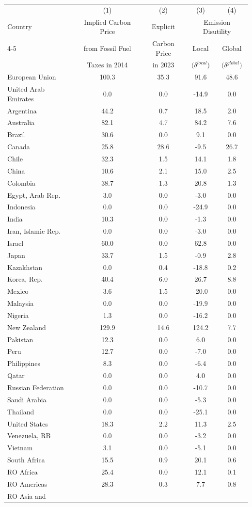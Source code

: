 \begin{tabular}{l c c cc}
\toprule
        & (1)         & (2)          & (3) & (4) \\
\addlinespace[3pt]
Country & Implied Carbon Price  & Explicit        & \multicolumn{2}{c}{Emission Disutility} \\
\cline{4-5}
\addlinespace[2pt]
        &  from Fossil Fuel            & Carbon Price    & Local & Global \\
        &   Taxes in 2014          & in 2023         & $\Big( \delta^{local} \Big)$ & $ \Big( \delta^{global} \Big)$ \\
\midrule
European Union & 100.3 & 35.3 & 91.6 & 48.6 \\United Arab Emirates & 0.0 & 0.0 & -14.9 & 0.0 \\Argentina & 44.2 & 0.7 & 18.5 & 2.0 \\Australia & 82.1 & 4.7 & 84.2 & 7.6 \\Brazil & 30.6 & 0.0 & 9.1 & 0.0 \\Canada & 25.8 & 28.6 & -9.5 & 26.7 \\Chile & 32.3 & 1.5 & 14.1 & 1.8 \\China & 10.6 & 2.1 & 15.0 & 2.5 \\Colombia & 38.7 & 1.3 & 20.8 & 1.3 \\Egypt, Arab Rep. & 3.0 & 0.0 & -3.0 & 0.0 \\Indonesia & 0.0 & 0.0 & -24.9 & 0.0 \\India & 10.3 & 0.0 & -1.3 & 0.0 \\Iran, Islamic Rep. & 0.0 & 0.0 & -3.0 & 0.0 \\Israel & 60.0 & 0.0 & 62.8 & 0.0 \\Japan & 33.7 & 1.5 & -0.9 & 2.8 \\Kazakhstan & 0.0 & 0.4 & -18.8 & 0.2 \\Korea, Rep. & 40.4 & 6.0 & 26.7 & 8.8 \\Mexico & 3.6 & 1.5 & -20.0 & 0.0 \\Malaysia & 0.0 & 0.0 & -19.9 & 0.0 \\Nigeria & 1.3 & 0.0 & -16.2 & 0.0 \\New Zealand & 129.9 & 14.6 & 124.2 & 7.7 \\Pakistan & 12.3 & 0.0 & 6.0 & 0.0 \\Peru & 12.7 & 0.0 & -7.0 & 0.0 \\Philippines & 8.3 & 0.0 & -6.4 & 0.0 \\Qatar & 0.0 & 0.0 & 4.0 & 0.0 \\Russian Federation & 0.0 & 0.0 & -10.7 & 0.0 \\Saudi Arabia & 0.0 & 0.0 & -5.3 & 0.0 \\Thailand & 0.0 & 0.0 & -25.1 & 0.0 \\United States & 18.3 & 2.2 & 11.3 & 2.5 \\Venezuela, RB & 0.0 & 0.0 & -3.2 & 0.0 \\Vietnam & 3.1 & 0.0 & -5.1 & 0.0 \\South Africa & 15.5 & 0.9 & 20.1 & 0.6 \\RO Africa & 25.4 & 0.0 & 12.1 & 0.1 \\RO Americas & 28.3 & 0.3 & 7.7 & 0.8 \\RO Asia and 
\end{tabular}
